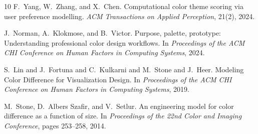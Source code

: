 \begin{thebibliography}{10}
F.~Yang, W.~Zhang, and X.~Chen.
\newblock Computational color theme scoring via user preference modelling.
\newblock \emph{ACM Transactions on Applied Perception}, 21(2), 2024.

J.~Norman, A.~Klokmose, and B.~Victor.
\newblock Purpose, palette, prototype: Understanding professional color design
workflows.
\newblock In \emph{Proceedings of the ACM CHI Conference on Human Factors in
Computing Systems}, 2024.

S.~Lin and J.~Fortuna and C.~Kulkarni and M.~Stone and J.~Heer.
\newblock Modeling Color Difference for Visualization Design.
\newblock In \emph{Proceedings of the ACM CHI Conference on Human Factors in
Computing Systems}, 2019.

M.~Stone, D.~Albers Szafir, and V.~Setlur.
\newblock An engineering model for color difference as a function of size.
\newblock In \emph{Proceedings of the 22nd Color and Imaging Conference},
pages 253--258, 2014.

\end{thebibliography}
